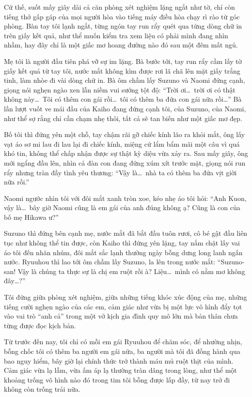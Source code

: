 ﻿\documentclass[../main.tex]{subfiles}
\begin{document}
Cứ thế, suốt mấy giây dài cả căn phòng xét nghiệm lặng ngắt như tờ, chỉ còn tiếng thở gấp gáp của mọi người hòa vào tiếng máy điều hòa chạy rì rào từ góc phòng. Bàn tay tôi lạnh ngắt, từng ngón tay run rẩy quét qua từng dòng chữ in trên giấy kết quả, như thể muốn kiểm tra xem liệu có phải mình đang nhìn nhầm, hay đây chỉ là một giấc mơ hoang đường nào đó sau một đêm mất ngủ.

Mẹ tôi là người đầu tiên phá vỡ sự im lặng. Bà bước tới, tay run rẩy cầm lấy tờ giấy kết quả từ tay tôi, nước mắt không kìm được rơi lã chã lên mặt giấy trắng tinh, làm nhòe đi vài dòng chữ in. Bà ôm chầm lấy Suzuno và Naomi đứng cạnh, giọng nói nghẹn ngào xen lẫn niềm vui sướng tột độ: ``Trời ơi\dots\ trời ơi có thật không này\dots\ Tôi có thêm con gái rồi\dots\ tôi có thêm ba đứa con gái nữa rồi\dots'' Bà lần lượt vuốt ve mái đầu của Kaiho đang đứng cạnh tôi, của Suzuno, của Naomi, như thể sợ rằng chỉ cần chạm nhẹ thôi, tất cả sẽ tan biến như một giấc mơ đẹp.

Bố tôi thì đứng yên một chỗ, tay chậm rãi gỡ chiếc kính lão ra khỏi mắt, ông lấy vạt áo sơ mi lau đi lau lại đi chiếc kính, miệng cứ lẩm bẩm mãi một câu vì quá khó tin, không thể chấp nhận được sự thật kỳ diệu vừa xảy ra. Sau mấy giây, ông mới ngẩng đầu lên, nhìn cả đàn con đang đứng xúm xít trước mặt, giọng nói run rẩy nhưng tràn đầy tình yêu thương: ``Vậy là\dots\ nhà ta có thêm ba đứa vịt giời nữa rồi.''

Naomi ngước nhìn tôi với đôi mắt xanh tròn xoe, kéo nhẹ áo tôi hỏi: ``Anh Kuon, vậy là\dots\ bây giờ Naomi cũng là em gái của anh đúng không ạ? Cũng là con của bố mẹ Hikawa ư?''

Suzuno thì đứng bên cạnh mẹ, nước mắt đã bắt đầu tuôn rươi, cô bé gật đầu liên tục như không thể tin được, còn Kaiho thì đứng yên lặng, tay nắm chặt lấy vai áo tôi đến nhăn nhúm, đôi mắt sắc lạnh thường ngày bỗng dưng long lanh ngấn nước. Ryuuhou thì lao tới ôm chầm lấy Suzuno, la lên trong nước mắt: ``Suzuno-san! Vậy là chúng ta thực sự là chị em ruột rồi à? Liệu\dots\ mình có nằm mơ không đây\dots?''

Tôi đứng giữa phòng xét nghiệm, giữa những tiếng khóc xúc động của mẹ, những tiếng cười nghẹn ngào của các em, cảm giác như vừa bị một lực vô hình đẩy tọt vào vai trò ``anh cả'' trong một vở kịch gia đình quy mô lớn mà bản thân chưa từng được đọc kịch bản.

Từ trước đến nay, tôi chỉ có mỗi em gái Ryuuhou để chăm sóc, để nhường nhịn, bỗng chốc tôi có thêm ba người em gái nữa, ba người mà tôi đã đồng hành qua bao nguy hiểm, bây giờ lại chính thức trở thành máu mủ ruột thịt của mình. Cảm giác vừa lạ lẫm, vừa ấm áp lạ thường tràn dâng trong lòng, như thể một khoảng trống vô hình nào đó trong tim tôi bỗng được lấp đầy, từ nay trở đi không còn trống trải nữa.
\end{document}
